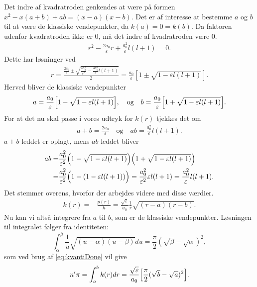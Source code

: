 Det indre af kvadratroden genkendes at være på formen $x^2 -x(a+b) + ab = (x-a)(x-b)$. Det er af interesse at bestemme $a$ og $b$ til at være de klassiske vendepunkter, da $k(a) = 0 = k(b)$. Da faktoren udenfor kvadratroden ikke er $0$, må det indre af kvadratroden være $0$.
%
\begin{align}
    r^2 - \frac{2a_0}{\varepsilon}r + \frac{a_0^2}{\varepsilon}l(l+1) = 0.
\end{align}
Dette har løsninger ved
\begin{align}
  r = \frac{\frac{2a_0}{\varepsilon} \pm \sqrt{\frac{4a_0^2}{\varepsilon^2} - \frac{4a_0^2}{\varepsilon}l(l+1)   }  }{2}
  = \frac{a_0}{\varepsilon}\left[1 \pm \sqrt{1-\varepsilon l(l+1)}\right].
\end{align}
Herved bliver de klassiske vendepunkter
\begin{align}
    a =  \frac{a_0}{\varepsilon}\Bigl[1-\sqrt{1-\varepsilon l(l+1)}  \Bigr],\quad \text{og} \quad b = \frac{a_0}{\varepsilon}\Bigl[1+\sqrt{1-\varepsilon l(l+1)}  \Bigr].
\end{align}
For at det nu skal passe i vores udtryk for $k(r)$ tjekkes det om
\begin{align}
    a+b = \frac{2a_0}{\varepsilon} \quad \text{og} \quad  ab  = \frac{a_0^2}{\varepsilon} l(l+1).
\end{align}
$a+b$ leddet er oplagt, mens $ab$ leddet bliver
\begin{align}
  ab = & \frac{a_0^2}{\varepsilon^2}\Bigl(1-\sqrt{1-\varepsilon l(l+1)} \Bigr)\Bigl(1+\sqrt{1-\varepsilon l(l+1)} \Bigr)\\
  = & \frac{a_0^2}{\varepsilon^2}\Bigl(1-(1-\varepsilon l(l+1)) \Bigr) =  \frac{a_0^2}{\varepsilon^2} \varepsilon l(l+1)
     = \frac{a_0^2}{\varepsilon} l(l+1).
\end{align}
%
Det stemmer overens, hvorfor der arbejdes videre med disse værdier.
\begin{align}
    k(r) = & \frac{p(r)}{\hbar} = \frac{\sqrt{\varepsilon}}{a_0}\frac{1}{r}\sqrt{(r-a)(r-b)}.
\end{align}
Nu kan vi altså integrere fra $a$ til $b$, som er de klassiske vendepunkter. Løsningen til integralet følger fra identiteten:
\begin{equation}
    \int_{\alpha}^{\beta}\frac{1}{u}\sqrt{(u-\alpha)(u-\beta)}du = \frac{\pi}{2}(\sqrt{\beta}-\sqrt{\alpha})^2,
\end{equation}
som ved brug af \cref{eq:kvantiDone} vil give
\begin{equation}
   n'\pi = \int_{a}^{b}k(r)dr = \frac{\sqrt{\varepsilon}}{a_0} \Bigl[\frac{\pi}{2}(\sqrt{b}-\sqrt{a})^2  \Bigr].
\end{equation}
